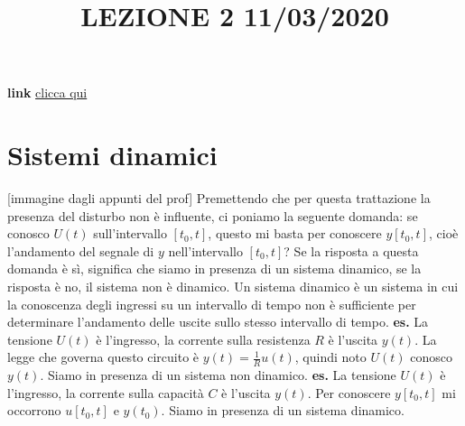 \title{LEZIONE 2 11/03/2020}\newline
\textbf{link} \href{https://web.microsoftstream.com/video/c3fbadab-4a18-4fbd-bd5c-3a50914235b4?list=user&userId=faa91214-a6f5-40d7-8875-253fd49b8ce1}{clicca qui}
\section{Sistemi dinamici} 
[immagine dagli appunti del prof]\newline
Premettendo che per questa trattazione la presenza del disturbo non è influente, ci poniamo la seguente domanda: se conosco $U(t)$ sull'intervallo $[t_0, t]$, questo mi basta per conoscere $y[t_0,t]$, cioè l'andamento del segnale di $y$ nell'intervallo $[t_0,t]$?\newline
Se la risposta a questa domanda è sì, significa che siamo in presenza di un sistema dinamico, se la risposta è no, il sistema non è dinamico.\newline
\newline
Un sistema dinamico è un sistema in cui la conoscenza degli ingressi su un intervallo di tempo non è sufficiente per determinare l'andamento delle uscite sullo stesso intervallo di tempo.\newline
\newline
\textbf{es.} \newline
La tensione $U(t)$ è l'ingresso, la corrente sulla resistenza $R$ è l'uscita $y(t)$. La legge che governa questo circuito è $y(t) = \frac{1}{R}u(t)$, quindi noto $U(t)$ conosco $y(t)$. Siamo in presenza di un sistema non dinamico.\newline
\newline
\textbf{es.} \newline
La tensione $U(t)$ è l'ingresso, la corrente sulla capacità $C$ è l'uscita $y(t)$. Per conoscere $y[t_0,t]$ mi occorrono $u[t_0,t]$ e $y(t_0)$. Siamo in presenza di un sistema dinamico.\newline
\newline
